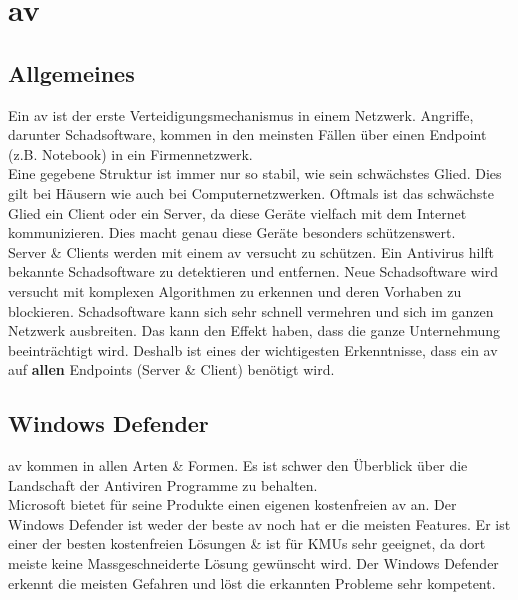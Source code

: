 \chapter{\acrlong{av}}
\section{Allgemeines} %
Ein \acrfull{av} ist der erste Verteidigungsmechanismus in einem Netzwerk. Angriffe, darunter Schadsoftware, kommen in den meinsten Fällen über einen Endpoint (z.B. Notebook) in ein Firmennetzwerk.\\

Eine gegebene Struktur ist immer nur so stabil, wie sein schwächstes Glied. Dies gilt bei Häusern wie auch bei Computernetzwerken.
Oftmals ist das schwächste Glied ein Client oder ein Server, da diese Geräte vielfach mit dem Internet kommunizieren.
Dies macht genau diese Geräte besonders schützenswert.\\

Server \& Clients werden mit einem \acrlong{av} versucht zu schützen. Ein Antivirus hilft bekannte Schadsoftware zu detektieren und entfernen.
Neue Schadsoftware wird versucht mit komplexen Algorithmen zu erkennen und deren Vorhaben zu blockieren.
Schadsoftware kann sich sehr schnell vermehren und sich im ganzen Netzwerk ausbreiten. 
Das kann den Effekt haben, dass die ganze Unternehmung beeinträchtigt wird.
Deshalb ist eines der wichtigesten Erkenntnisse, dass ein \acrlong{av} auf \textbf{allen} Endpoints (Server \& Client) benötigt wird.





\section{Windows Defender}
\acrfull{av} kommen in allen Arten \& Formen.
Es ist schwer den Überblick über die Landschaft der Antiviren Programme zu behalten.\\


Microsoft bietet für seine Produkte einen eigenen kostenfreien \acrlong{av} an.
Der Windows Defender ist weder der beste \acrshort{av} noch hat er die meisten Features.
Er ist einer der besten kostenfreien Lösungen \& ist für KMUs sehr geeignet, da dort meiste keine Massgeschneiderte Lösung gewünscht wird.
Der Windows Defender erkennt die meisten Gefahren und löst die erkannten Probleme sehr kompetent.\\

